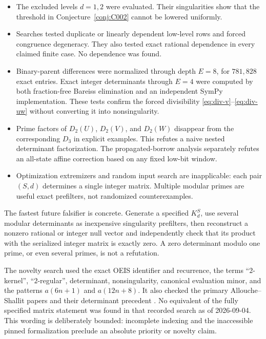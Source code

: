 \documentclass[11pt]{amsart}
\theoremstyle{definition}
\begin{document}
\begin{itemize}
\item The excluded levels $d=1,2$ were evaluated.  Their singularities show
that the threshold in Conjecture~\ref{conj:C002} cannot be lowered uniformly.

\item Searches tested duplicate or linearly dependent low-level rows and
forced congruence degeneracy.  They also tested exact rational dependence in
every claimed finite case.  No dependence was found.

\item Binary-parent differences were normalized through depth $E=8$, for
$781{,}828$ exact entries.  Exact integer determinants through $E=4$ were
computed by both fraction-free Bareiss elimination and an independent SymPy
implementation.  These tests confirm the forced divisibility
\eqref{eq:div-v}--\eqref{eq:div-uw} without converting it into
nonsingularity.

\item Prime factors of $D_2(U)$, $D_2(V)$, and $D_2(W)$ disappear from the
corresponding $D_3$ in explicit examples.  This refutes a naive nested
determinant factorization.  The propagated-borrow analysis separately refutes
an all-state affine correction based on any fixed low-bit window.

\item Optimization extremizers and random input search are inapplicable:
each pair $(S,d)$ determines a single integer matrix.  Multiple modular primes
are useful exact prefilters, not randomized counterexamples.
\end{itemize}

The fastest future falsifier is concrete.  Generate a specified $K_d^S$,
use several modular determinants as inexpensive singularity prefilters, then
reconstruct a nonzero rational or integer null vector and independently check
that its product with the serialized integer matrix is exactly zero.  A zero
determinant modulo one prime, or even several primes, is not a refutation.

The novelty search used the exact OEIS identifier and recurrence, the terms
``$2$-kernel'', ``$2$-regular'', determinant, nonsingularity, canonical
evaluation minor, and the patterns $a(6n+1)$ and $a(12n+8)$.  It also checked
the primary Allouche--Shallit papers and their determinant precedent
\cite{AlloucheShallit1992,AlloucheShallit2003}.  No equivalent of the fully
specified matrix statement was found in that recorded search as of
2026-09-04.  This wording is deliberately bounded: incomplete indexing and
the inaccessible pinned formalization preclude an absolute priority or
novelty claim.
\end{document}
